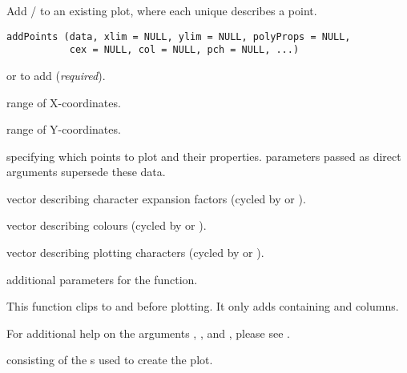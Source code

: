 \documentclass[letterpaper]{book}
\begin{document}
%
\begin{Description}\relax
Add / to an existing plot, where each
unique  describes a point.
\end{Description}
%
\begin{Usage}
\begin{verbatim}
addPoints (data, xlim = NULL, ylim = NULL, polyProps = NULL,
           cex = NULL, col = NULL, pch = NULL, ...)
\end{verbatim}
\end{Usage}
%
\begin{Arguments}
\begin{ldescription}
\item[\code{data}]  or  to add (\emph{required}).
\item[\code{xlim}] range of X-coordinates.
\item[\code{ylim}] range of Y-coordinates.
\item[\code{polyProps}]  specifying which points to plot and their
properties.   parameters passed as direct arguments
supersede these data.
\item[\code{cex}] vector describing character expansion factors (cycled by
 or ).
\item[\code{col}] vector describing colours (cycled by  or
).
\item[\code{pch}] vector describing plotting characters (cycled by 
or ).
\item[\code{...}] additional  parameters for the
 function.
\end{ldescription}
\end{Arguments}
%
\begin{Details}\relax
This function clips  to  and  before
plotting.  It only adds  containing  and
 columns.

For additional help on the arguments , , and
, please see .
\end{Details}
%
\begin{Value}
 consisting of the s used to create the plot.
\end{Value}
\end{document}

